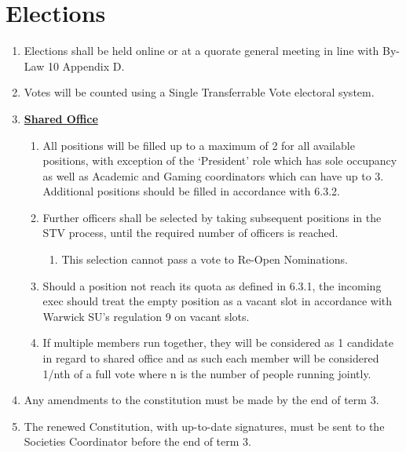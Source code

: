 \documentclass{article}
\begin{document}
\section{Elections}
\begin{enumerate}
    \item Elections shall be held online or at a quorate general meeting in line with By-Law 10 Appendix D.
    \item Votes will be counted using a Single Transferrable Vote electoral system.
    \item \textbf{\underline{Shared Office}}
    \begin{enumerate}
        \item All positions will be filled up to a maximum of 2 for all available positions, with exception of the `President' role which has sole occupancy as well as Academic and Gaming coordinators which can have up to 3. Additional positions should be filled in accordance with 6.3.2.
        \item Further officers shall be selected by taking subsequent positions in the STV process, until the required number of officers is reached.
        \begin{enumerate}
            \item This selection cannot pass a vote to Re-Open Nominations.
        \end{enumerate}
        \item Should a position not reach its quota as defined in 6.3.1, the incoming exec should treat the empty position as a vacant slot in accordance with Warwick SU's regulation 9 on vacant slots.
        \item If multiple members run together, they will be considered as 1 candidate in regard to shared office and as such each member will be considered 1/nth of a full vote where n is the number of people running jointly.
    \end{enumerate}
    \item Any amendments to the constitution must be made by the end of term 3.
    \item The renewed Constitution, with up-to-date signatures, must be sent to the Societies Coordinator before the end of term 3.
\end{enumerate}
\end{document}

